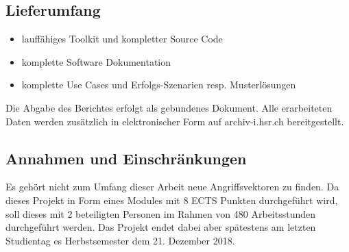 \subsection{Lieferumfang}
\begin{itemize}
    \item lauffähiges Toolkit und kompletter Source Code
    \item komplette Software Dokumentation 
    \item komplette Use Cases und Erfolgs-Szenarien resp. Musterlösungen
\end{itemize}
Die Abgabe des Berichtes erfolgt als gebundenes Dokument. Alle erarbeiteten Daten werden zusätzlich in elektronischer Form auf archiv-i.hsr.ch bereitgestellt.

\subsection{Annahmen und Einschränkungen}
Es gehört nicht zum Umfang dieser Arbeit neue Angriffsvektoren zu finden. Da dieses Projekt in Form eines Modules mit 8 ECTS Punkten durchgeführt wird, soll dieses mit 2 beteiligten Personen im Rahmen von 480 Arbeitsstunden durchgeführt werden. Das Projekt endet dabei aber spätestens am letzten Studientag es Herbstsemester dem 21. Dezember 2018.